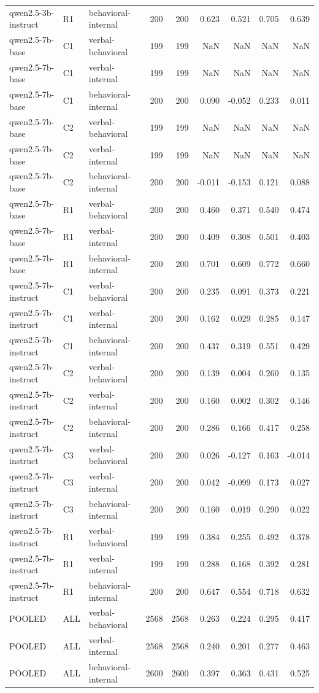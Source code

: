 \begin{table}
\begin{tabular}{lllrrrrrr}
qwen2.5-3b-instruct & R1 & behavioral-internal & 200 & 200 & 0.623 & 0.521 & 0.705 & 0.639 \\
qwen2.5-7b-base & C1 & verbal-behavioral & 199 & 199 & NaN & NaN & NaN & NaN \\
qwen2.5-7b-base & C1 & verbal-internal & 199 & 199 & NaN & NaN & NaN & NaN \\
qwen2.5-7b-base & C1 & behavioral-internal & 200 & 200 & 0.090 & -0.052 & 0.233 & 0.011 \\
qwen2.5-7b-base & C2 & verbal-behavioral & 199 & 199 & NaN & NaN & NaN & NaN \\
qwen2.5-7b-base & C2 & verbal-internal & 199 & 199 & NaN & NaN & NaN & NaN \\
qwen2.5-7b-base & C2 & behavioral-internal & 200 & 200 & -0.011 & -0.153 & 0.121 & 0.088 \\
qwen2.5-7b-base & R1 & verbal-behavioral & 200 & 200 & 0.460 & 0.371 & 0.540 & 0.474 \\
qwen2.5-7b-base & R1 & verbal-internal & 200 & 200 & 0.409 & 0.308 & 0.501 & 0.403 \\
qwen2.5-7b-base & R1 & behavioral-internal & 200 & 200 & 0.701 & 0.609 & 0.772 & 0.660 \\
qwen2.5-7b-instruct & C1 & verbal-behavioral & 200 & 200 & 0.235 & 0.091 & 0.373 & 0.221 \\
qwen2.5-7b-instruct & C1 & verbal-internal & 200 & 200 & 0.162 & 0.029 & 0.285 & 0.147 \\
qwen2.5-7b-instruct & C1 & behavioral-internal & 200 & 200 & 0.437 & 0.319 & 0.551 & 0.429 \\
qwen2.5-7b-instruct & C2 & verbal-behavioral & 200 & 200 & 0.139 & 0.004 & 0.260 & 0.135 \\
qwen2.5-7b-instruct & C2 & verbal-internal & 200 & 200 & 0.160 & 0.002 & 0.302 & 0.146 \\
qwen2.5-7b-instruct & C2 & behavioral-internal & 200 & 200 & 0.286 & 0.166 & 0.417 & 0.258 \\
qwen2.5-7b-instruct & C3 & verbal-behavioral & 200 & 200 & 0.026 & -0.127 & 0.163 & -0.014 \\
qwen2.5-7b-instruct & C3 & verbal-internal & 200 & 200 & 0.042 & -0.099 & 0.173 & 0.027 \\
qwen2.5-7b-instruct & C3 & behavioral-internal & 200 & 200 & 0.160 & 0.019 & 0.290 & 0.022 \\
qwen2.5-7b-instruct & R1 & verbal-behavioral & 199 & 199 & 0.384 & 0.255 & 0.492 & 0.378 \\
qwen2.5-7b-instruct & R1 & verbal-internal & 199 & 199 & 0.288 & 0.168 & 0.392 & 0.281 \\
qwen2.5-7b-instruct & R1 & behavioral-internal & 200 & 200 & 0.647 & 0.554 & 0.718 & 0.632 \\
POOLED & ALL & verbal-behavioral & 2568 & 2568 & 0.263 & 0.224 & 0.295 & 0.417 \\
POOLED & ALL & verbal-internal & 2568 & 2568 & 0.240 & 0.201 & 0.277 & 0.463 \\
POOLED & ALL & behavioral-internal & 2600 & 2600 & 0.397 & 0.363 & 0.431 & 0.525 \\
\bottomrule
\end{tabular}
\end{table}
